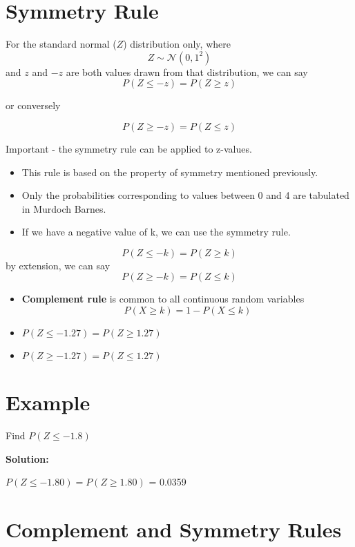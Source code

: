 \documentclass[]{report}
\begin{document}
\section{Symmetry Rule}
For the standard normal ($Z$) distribution only, where \[Z \sim \mathcal{N}(0,1^2)\] and $z$ and $-z$ are both values drawn from that distribution, we can say
\[ P(Z \leq -z) = P(Z \geq z) \]

or conversely

\[ P(Z \geq -z) = P(Z \leq z) \]

Important - the symmetry rule can be applied to z-values.



\begin{itemize}
\item
This rule is based on the property of symmetry mentioned previously.
\item
Only the probabilities corresponding to values between 0 and 4 are tabulated in Murdoch Barnes.
\item
If we have a negative value of k, we can use the symmetry rule.
\end{itemize}
\[P(Z \leq -k) = P(Z \geq k) \]
by extension, we can say
\[P(Z \geq -k) = P(Z \leq k) \]

\begin{itemize} 
\item \textbf{Complement rule} is common to all continuous random variables
\[P(X \geq k) = 1 - P(X \leq k) \]
\end{itemize}



\begin{itemize}
\item $ P(Z \leq -1.27) = P(Z \geq 1.27) $
\item $ P(Z \geq -1.27) = P(Z \leq 1.27) $
\end{itemize}

  
\section*{Example}

Find  $P(Z \leq -1.8)$

\noindent \textbf{Solution:} 

$P(Z \leq -1.80) = P(Z \geq 1.80) $ = 0.0359



\section{Complement and Symmetry Rules}
\end{document}
